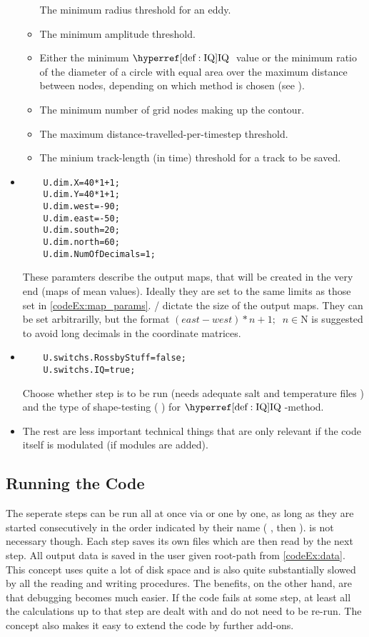 \begin{itemize}
\begin{itemize}
	The minimum radius threshold for an eddy.
	\item
	The minimum amplitude threshold.
	\item
	Either the minimum $\IQ$ value or the minimum ratio of the diameter of a
circle	 with equal area over the maximum distance between nodes, depending on
which	 method is chosen (see ). 
	\item
	The minimum number of grid nodes making up the contour.
	\item
	The maximum distance-travelled-per-timestep threshold.
	\item
	The minium track-length (in time) threshold for a track to be saved.
	\end{itemize}
\item

\begin{lstlisting}
	U.dim.X=40*1+1;
	U.dim.Y=40*1+1;
	U.dim.west=-90;
	U.dim.east=-50;
	U.dim.south=20;
	U.dim.north=60;
	U.dim.NumOfDecimals=1;
\end{lstlisting}
These paramters describe the output maps, that will be created in the very end
(\eg maps of mean values). Ideally they are set to the same limits as
those set in \ref{codeEx:map_params}. / dictate
the size of the output maps. They can be set arbitrarilly, but the format \eg
$(east-west)*n +1; \;\; n \in \mathrm{N}$ is suggested to avoid long decimals in
the coordinate matrices.
\item
\begin{lstlisting}
	U.switchs.RossbyStuff=false;
	U.switchs.IQ=true;	
\end{lstlisting}
Choose whether step  is to be run (needs adequate
salt and temperature files ) and the type of shape-testing (
) for $\IQ$-method.
\item
The rest are less important technical things that are only relevant if the code
itself is modulated (\eg if modules are added).
\end{itemize}

\subsection{Running the Code}
The seperate steps can be run all at once via  or one by one, as
long as they are started consecutively in the order indicated by their name
( , then  \etc).  is not necessary
though. Each step saves its own files which are then read by the next step.
All output data is saved in the user given root-path from \ref{codeEx:data}.
This concept uses quite a lot of disk space and is also quite substantially
slowed by all the reading and writing procedures. The benefits, on the other
hand, are that debugging becomes much easier. If the code fails at some step,
at least all the calculations up to that step are dealt with and do not need to
be re-run. The concept also makes it easy to extend the code by further
add-ons.

